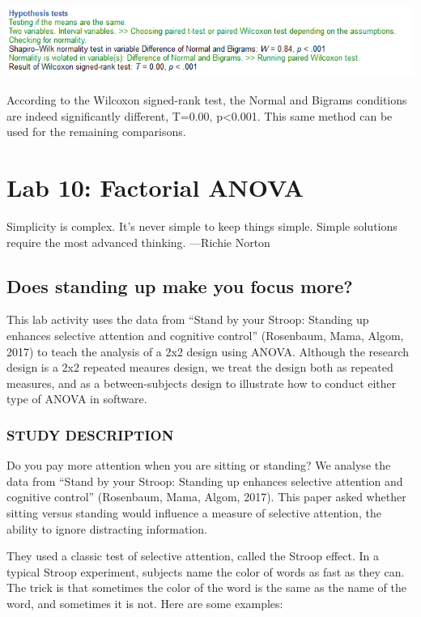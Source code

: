 \documentclass[
]{book}
\begin{document}
\includegraphics{img/ch9/9.5CRMVAG_hyptest.png}

According to the Wilcoxon signed-rank test, the Normal and Bigrams conditions are indeed significantly different, T=0.00, p\textless0.001. This same method can be used for the remaining comparisons.

\hypertarget{lab-10-factorial-anova}{%
\chapter{Lab 10: Factorial ANOVA}\label{lab-10-factorial-anova}}

{
Simplicity is complex. It's never simple to keep things simple. Simple solutions require the most advanced thinking.
---Richie Norton
}

\hypertarget{does-standing-up-make-you-focus-more}{%
\section{Does standing up make you focus more?}\label{does-standing-up-make-you-focus-more}}

This lab activity uses the data from ``Stand by your Stroop: Standing up enhances selective attention and cognitive control'' (Rosenbaum, Mama, Algom, 2017) to teach the analysis of a 2x2 design using ANOVA. Although the research design is a 2x2 repeated meaures design, we treat the design both as repeated measures, and as a between-subjects design to illustrate how to conduct either type of ANOVA in software.

\hypertarget{study-description-5}{%
\subsection{STUDY DESCRIPTION}\label{study-description-5}}

Do you pay more attention when you are sitting or standing? We analyse the data from ``Stand by your Stroop: Standing up enhances selective attention and cognitive control'' (Rosenbaum, Mama, Algom, 2017). This paper asked whether sitting versus standing would influence a measure of selective attention, the ability to ignore distracting information.

They used a classic test of selective attention, called the Stroop effect. In a typical Stroop experiment, subjects name the color of words as fast as they can. The trick is that sometimes the color of the word is the same as the name of the word, and sometimes it is not. Here are some examples:
\end{document}
